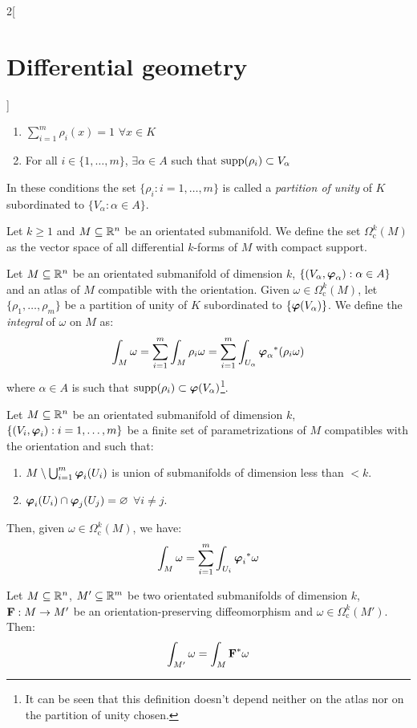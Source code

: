 \documentclass[../../../main_math.tex]{subfiles}
\begin{document}
\begin{multicols}{2}[\section{Differential geometry}]
\begin{proposition}
    \begin{enumerate}
      \item $\sum_{i=1}^m\rho_i(x)=1$ $\forall x\in K$
      \item For all $i\in\{1,\ldots,m\}$, $\exists \alpha\in A$ such that $\operatorname{supp}(\rho_i)\subset V_\alpha$
    \end{enumerate}
    In these conditions the set $\{\rho_i:i=1,\ldots,m\}$ is called a \emph{partition of unity} of $K$ subordinated to $\{V_\alpha:\alpha\in A\}$.
  \end{proposition}
  \begin{definition}
    Let $k\geq 1$ and $M\subseteq\mathbb{R}^n$ be an orientated submanifold. We define the set $\Omega_\text{c}^k(M)$ as the vector space of all differential $k$-forms of $M$ with compact support.
  \end{definition}
  \begin{definition}
    Let $M\subseteq\mathbb{R}^n$ be an orientated submanifold of dimension $k$, $\{(V_\alpha,\boldsymbol{\mathrm{\varphi}}_\alpha):\alpha\in A\}$ and an atlas of $M$ compatible with the orientation. Given $\omega\in\Omega_\text{c}^k(M)$, let $\{\rho_1,\ldots,\rho_m\}$ be a partition of unity of $K$ subordinated to $\{\boldsymbol{\mathrm{\varphi}}(V_\alpha)\}$. We define the \emph{integral} of $\omega$ on $M$ as:
    $$\int_M\omega=\sum_{i= 1}^m\int_M\rho_i\omega=\sum_{i= 1}^m\int_{U_\alpha}{\boldsymbol{\mathrm{\varphi}}_\alpha}^*(\rho_i\omega)$$
    where $\alpha\in A$ is such that $\operatorname{supp}(\rho_i)\subset \boldsymbol{\mathrm{\varphi}}(V_\alpha)$\footnote{It can be seen that this definition doesn't depend neither on the atlas nor on the partition of unity chosen.}.
  \end{definition}
  \begin{proposition}
    Let $M\subseteq\mathbb{R}^n$ be an orientated submanifold of dimension $k$, $\{(V_i,\boldsymbol{\mathrm{\varphi}}_i):i=1,\ldots,m\}$ be a finite set of parametrizations of $M$ compatibles with the orientation and such that:
    \begin{enumerate}
      \item $M\setminus\bigcup_{i= 1}^m\boldsymbol{\mathrm{\varphi}}_i(U_i)$ is union of submanifolds of dimension less than $<k$.
      \item $\boldsymbol{\mathrm{\varphi}}_i(U_i)\cap\boldsymbol{\mathrm{\varphi}}_j(U_j)=\varnothing$ $\forall i\ne j$.
    \end{enumerate}
    Then, given $\omega\in \Omega_\text{c}^k(M)$, we have: $$\int_M\omega=\sum_{i= 1}^m\int_{U_i}{\boldsymbol{\mathrm{\varphi}}_i}^*\omega$$
  \end{proposition}
  \begin{theorem}
    Let $M\subseteq\mathbb{R}^n$, $M'\subseteq \mathbb{R}^m$ be two orientated submanifolds of dimension $k$, $\boldsymbol{\mathrm{F}}:M\rightarrow M'$ be an orientation-preserving diffeomorphism and $\omega\in \Omega_\text{c}^k(M')$. Then: $$\int_{M'}\omega=\int_M\boldsymbol{\mathrm{F}}^*\omega$$
  \end{theorem}

\end{multicols}
\end{document}
